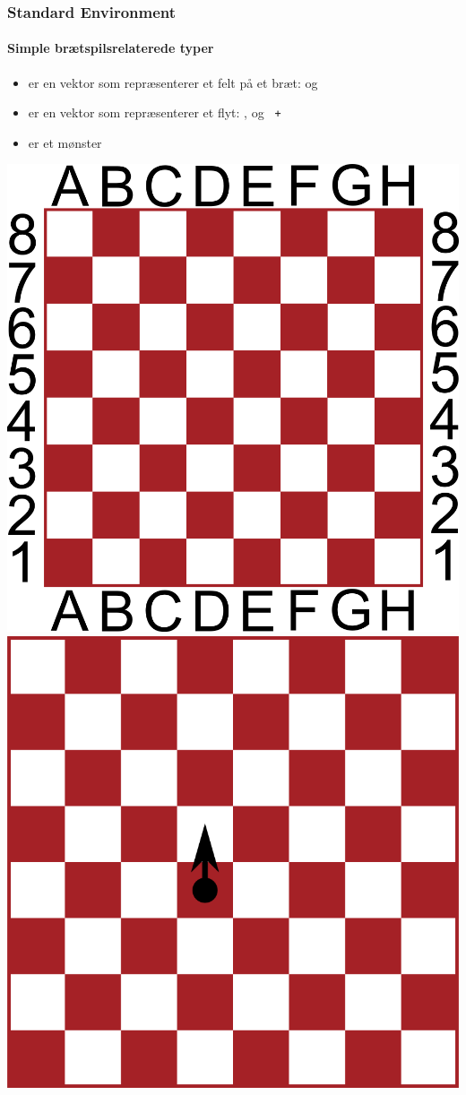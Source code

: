 \begin{frame}
\frametitle{Standard Environment}
\framesubtitle{Simple brætspilsrelaterede typer}
\begin{itemize}[<+->]
\item {} er en vektor som repræsenterer et felt på et bræt:  og 
\item {} er en vektor som repræsenterer et flyt: ,  og \texttt{ + }
\item {} er et mønster
\end{itemize}
\begin{center}
\includegraphics{niels/coordinates.png}
\hspace{0.5cm}
\includegraphics{niels/direction_n.png}

\end{center}
\end{frame}
